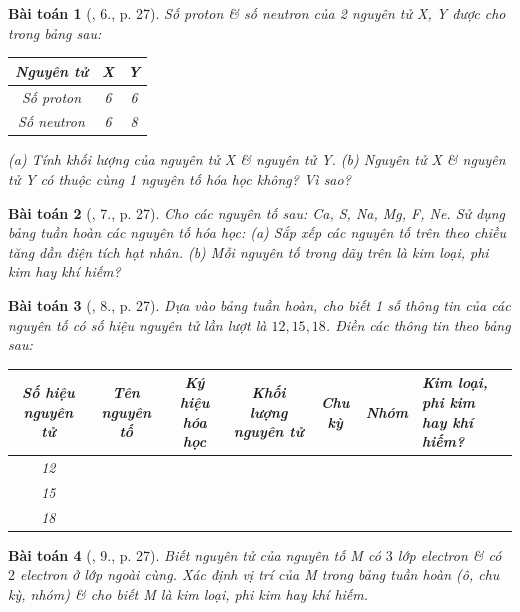 \documentclass{article}
\newtheorem{baitoan}{Bài toán}
\begin{document}
\begin{baitoan}[\cite{SGK_KHTN_7_Canh_Dieu}, 6., p. 27]
	Số proton \& số neutron của 2 nguyên tử X, Y được cho trong bảng sau:
	\begin{table}[H]
		\centering
		\begin{tabular}{|c|c|c|}
			\hline
			Nguyên tử & X & Y \\
			\hline
			Số proton & 6 & 6 \\
			\hline
			Số neutron & 6 & 8 \\
			\hline
		\end{tabular}
	\end{table}
	\noindent(a) Tính khối lượng của nguyên tử X \& nguyên tử Y. (b) Nguyên tử X \& nguyên tử Y có thuộc cùng 1 nguyên tố hóa học không? Vì sao?
\end{baitoan}

\begin{baitoan}[\cite{SGK_KHTN_7_Canh_Dieu}, 7., p. 27]
	Cho các nguyên tố sau: \emph{Ca, S, Na, Mg, F, Ne}. Sử dụng bảng tuần hoàn các nguyên tố hóa học: (a) Sắp xếp các nguyên tố trên theo chiều tăng dần điện tích hạt nhân. (b) Mỗi nguyên tố trong dãy trên là kim loại, phi kim hay khí hiếm?
\end{baitoan}

\begin{baitoan}[\cite{SGK_KHTN_7_Canh_Dieu}, 8., p. 27]
	Dựa vào bảng tuần hoàn, cho biết 1 số thông tin của các nguyên tố có số hiệu nguyên tử lần lượt là $12,15,18$. Điền các thông tin theo bảng sau:
	\begin{table}[H]
		\centering
		\begin{tabular}{|c|c|c|c|c|c|p{3.5cm}|}
			\hline
			Số hiệu nguyên tử & Tên nguyên tố & Ký hiệu hóa học & Khối lượng nguyên tử & Chu kỳ & Nhóm & Kim loại, phi kim hay khí hiếm? \\
			\hline
			12 &  &  &  &  &  &  \\
			\hline
			15 &  &  &  &  &  &  \\
			\hline
			18 &  &  &  &  &  &  \\
			\hline
		\end{tabular}
	\end{table}
\end{baitoan}

\begin{baitoan}[\cite{SGK_KHTN_7_Canh_Dieu}, 9., p. 27]
	Biết nguyên tử của nguyên tố M có $3$ lớp electron \& có $2$ electron ở lớp ngoài cùng. Xác định vị trí của M trong bảng tuần hoàn (ô, chu kỳ, nhóm) \& cho biết M là kim loại, phi kim hay khí hiếm.
\end{baitoan}
\end{document}
